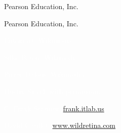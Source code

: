 \documentclass[t]{beamer}
\begin{document}
%
{
\begin{frame}[b]

\tiny\textcopyright Pearson Education, Inc.
\end{frame}
}
%
{
\begin{frame}[b]

\tiny\textcopyright Pearson Education, Inc.
\end{frame}
}
%
%
{
\begin{frame}
\end{frame}
}
%
{
\begin{frame}[plain]
\end{frame}
}

{
\begin{frame}[b,plain]
\hfill\textcolor{white}{\tiny \textcopyright Entomart, Wikimedia}
\end{frame}
}
{
\begin{frame}[b]
\tiny\textcolor{white}{Silke Baron, Wikimedia }
\end{frame}
}
%
{
\begin{frame}[b]
\hfill\textcolor{white}{\tiny Pierre Dalous, Wikimedia, \ccbysa{}}
\end{frame}
}
%
{
\begin{frame}[b]
\hfill\textcolor{white}{\tiny \textcopyright Dustin Siegel, with permission.}
\end{frame}
}
%
{
\begin{frame}[b]
\hfill\textcolor{white}{\tiny C. Frank Starmer, \href{http://frank.itlab.us}{frank.itlab.us},\ccbyncsa{}}
\end{frame}
}
%
{
\begin{frame}[b]
\hfill\textcolor{white}{\tiny David Carillet, \href{http://www.wildretina.com}{www.wildretina.com}, }
\end{frame}
}
\end{document}
